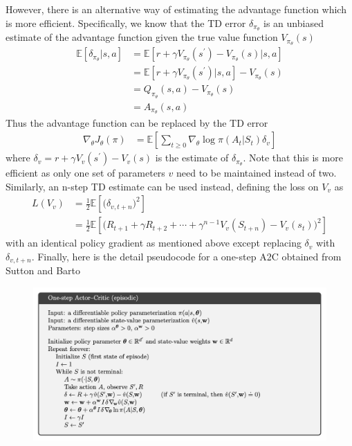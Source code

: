 \documentclass[12pt]{report}
\begin{document}
However, there is an alternative way of estimating the advantage function which is more efficient. Specifically, we know that the TD error $\delta_{\pi_\theta}$ is an unbiased estimate \cite{silver2015} of the advantage function given the true value function $V_{\pi_\theta}(s)$
\begin{align}
    \mathbb{E}[\delta_{\pi_\theta}|s,a] &= \mathbb{E}[r + \gamma V_{\pi_\theta}(s^\prime) - V_{\pi_\theta}(s)|s,a] \nonumber\\
    &= \mathbb{E}[r + \gamma V_{\pi_\theta}(s^\prime)|s,a] - V_{\pi_\theta}(s) \nonumber\\
    &= Q_{\pi_\theta}(s,a) - V_{\pi_\theta}(s)\nonumber\\
    &= A_{\pi_\theta}(s,a) \nonumber
\end{align}
Thus the advantage function can be replaced by the TD error
\begin{align}
    \nabla_\theta J_\theta(\pi) &= \mathbb{E}\left[\sum_{t\ge0} \nabla_\theta \log \pi(A_t|S_t) \delta_v\right] \label{eq:A2C-policy-grad}
\end{align}
where $\delta_v = r + \gamma V_v(s^\prime) - V_v(s)$ is the estimate of $\delta_{\pi_\theta}$. Note that this is more efficient as only one set of parameters $v$ need to be maintained instead of two. Similarly, an n-step TD estimate can be used instead, defining the loss on $V_v$ as
\begin{align}
    L(V_v) &= \frac{1}{2}\mathbb{E}\left[\Big(\delta_{v,t+n}\Big)^2\right]\\
    &= \frac{1}{2}\mathbb{E}\left[\Big(R_{t+1}+ \gamma R_{t+2} + \cdots + \gamma^{n-1}V_v(S_{t+n})-V_v(s_t)\Big)^2\right]
\end{align}
with an identical policy gradient as mentioned above except replacing $\delta_v$ with $\delta_{v,t+n}$. Finally, here is the detail pseudocode for a one-step A2C obtained from Sutton and Barto \cite{sutton2018reinforcement}
\begin{figure}[H]
    \center
    \includegraphics[width=0.85\linewidth]{figs/A2C.png}
    \label{fig:A2C}
\end{figure}
\end{document}
